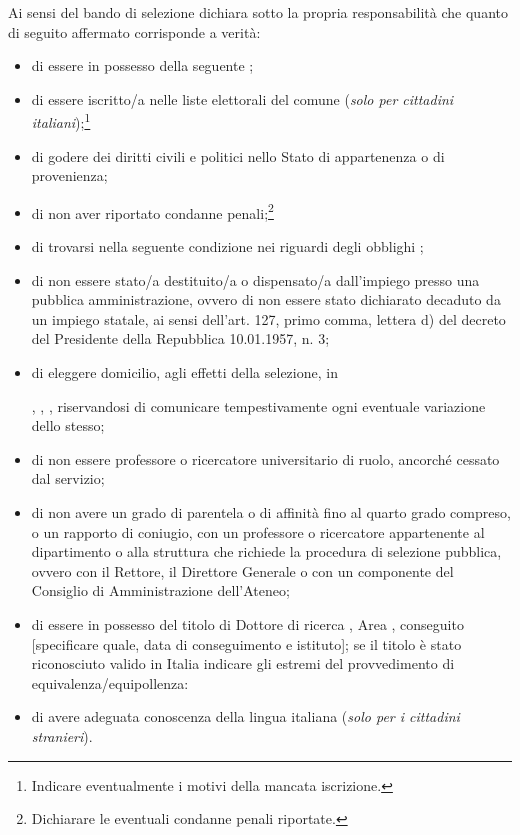 	Ai sensi del bando di selezione \myTextField[.5cm]{} 
	dichiara sotto la propria responsabilità che quanto di seguito affermato
	corrisponde a verità:
	\begin{itemize}
		\item di essere in possesso della seguente ;
		\item di essere iscritto/a nelle liste elettorali del comune 
		      (\emph{solo per cittadini italiani});\footnote{Indicare eventualmente i motivi
			      della mancata iscrizione.}

		      \myTextField[.9\textwidth]{}
		\item di godere dei diritti civili e politici nello Stato di appartenenza o di
		      provenienza;
		\item di non aver riportato condanne penali;\footnote{Dichiarare le eventuali
			      condanne penali riportate.}

		      \myTextField[.9\textwidth]{}
		\item di trovarsi nella seguente condizione nei riguardi degli obblighi
		      ;
		\item di non essere stato/a destituito/a o dispensato/a dall'impiego presso una
		      pubblica amministrazione, ovvero di non essere stato dichiarato decaduto da un
		      impiego statale, ai sensi dell'art. 127, primo comma, lettera d) del decreto
		      del Presidente della Repubblica 10.01.1957, n. 3;
		\item di eleggere domicilio, agli effetti della selezione, in
		      \begin{center}
			      \titleTextField[6cm]{}
		      \end{center}
		      , , ,
		      riservandosi di comunicare tempestivamente ogni eventuale variazione dello stesso;
		\item di non essere professore o ricercatore universitario di ruolo, ancorché
		      cessato dal servizio;
		\item di non avere un grado di parentela o di affinità fino al quarto grado
		      compreso, o un rapporto di coniugio, con un professore o ricercatore appartenente
		      al dipartimento o alla struttura che richiede la procedura di selezione pubblica,
		      ovvero con il Rettore, il Direttore Generale o con un componente del Consiglio
			di Amministrazione dell’Ateneo;
		\item di essere in possesso del titolo di Dottore di ricerca , Area , conseguito  [specificare quale, data di conseguimento e istituto]; se il titolo è stato riconosciuto valido in Italia indicare gli estremi del provvedimento di equivalenza/equipollenza:
		
		\myTextField[.9\textwidth]{}
		\item di avere adeguata conoscenza della lingua italiana (\emph{solo per i
			      cittadini stranieri}).
	\end{itemize}
